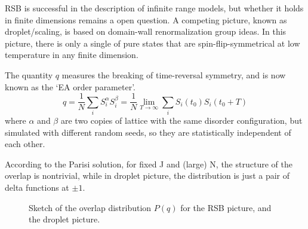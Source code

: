 RSB is successful in the description of infinite range models, but whether it 
holds in finite dimensions remains a open question. 
A competing picture, known as droplet/scaling, is based on domain-wall 
renormalization group ideas. In this picture, there is only a single of
pure states that are spin-flip-symmetrical at low temperature in any finite 
dimension. 



The quantity $q$ measures the breaking of time-reversal symmetry, and is now 
known as the ‘EA order parameter’.
\begin{equation}
  \label{eq:q}
  q=\frac{1}{N}\sum_iS_i^\alpha S_i^\beta=\frac{1}{N}\lim_{T\to \infty}\sum_iS_i(t_0)S_i(t_0+T)
\end{equation}
where $\alpha$ and $\beta$ are two copies of lattice with the same disorder 
configuration, but simulated with different random seeds, so they are
statistically independent of each other. 

According to the Parisi solution, for fixed J and (large) N, the structure of 
the overlap is nontrivial, while in droplet picture, the distribution is just 
a pair of delta functions at $\pm 1$. 

\begin{figure}
  \centering
  \hspace{0.5cm}
  \caption{Sketch of the overlap distribution $P(q)$ for the RSB picture, and the
droplet picture.}
  \label{fig:overlap}
\end{figure}


